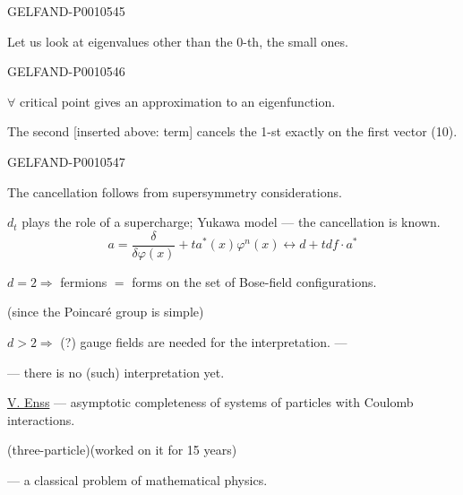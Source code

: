 \begin{GelfandAdjacentEvidence}{GELFAND-P001054}{5}

Let us look at eigenvalues other than the $0$-th, the small ones.
\end{GelfandAdjacentEvidence}
\begin{GelfandAdjacentEvidence}{GELFAND-P001054}{6}


$\forall$ critical point gives an approximation to an eigenfunction.

The second [inserted above: term]
cancels the 1-st exactly on the first vector (10).
\end{GelfandAdjacentEvidence}
\begin{GelfandAdjacentEvidence}{GELFAND-P001054}{7}


The cancellation follows from supersymmetry considerations.

$d_t$ plays the role of a supercharge; Yukawa model — the cancellation is known.
\begin{equation*}
a=\frac{\delta}{\delta\varphi(x)}+ta^*(x)\varphi^n(x)
\leftrightarrow d+tdf\cdot a^*
\tag{11}
\end{equation*}
\end{GelfandAdjacentEvidence}


\underline{$d=2$}$\Rightarrow$ fermions $=$ forms on the set of Bose-field configurations.

(since the Poincaré group is simple)

\underline{$d>2$}$\Rightarrow$ (?) gauge fields are needed for the interpretation. —

— there is no (such) interpretation yet.

\underline{V. Enss} — asymptotic completeness of systems of particles with Coulomb interactions.

(three-particle)\qquad (worked on it for 15 years)

— a classical problem of mathematical physics.


